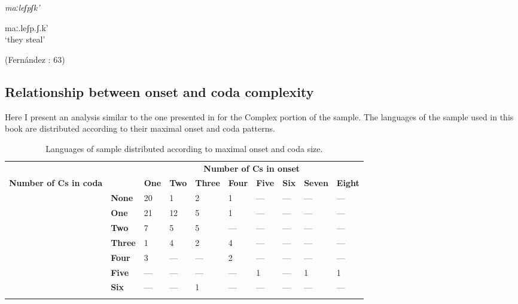 \ea\label{ex:3.14}

\textit{maːleʃpʃk’}

maː.leʃp.ʃ.k’\\
\glt ‘they steal’

(Fernández \citealt{GarayHernández2006}: 63)
\z

\subsection{Relationship between onset and coda complexity}\label{sec:3.3.2}

  Here I present an analysis similar to the one presented in  for the Complex portion of the \citet{Maddieson2013a} sample. The languages of the sample used in this book are distributed according to their maximal onset and coda patterns.

\begin{table}
\begin{tabularx}{\textwidth}{XXXXXXXXXX}
\lsptoprule

{} &  & \multicolumn{8}{c}{ \textbf{Number of Cs in onset}}\\
{ \textbf{Number of Cs in coda}} &  & \textbf{One} & \textbf{Two} & \textbf{Three} & \textbf{Four} & \textbf{Five} & \textbf{Six} & \textbf{Seven} & \textbf{Eight}\\
& \textbf{None} & 20 & 1 & 2 & 1 & — & — & — & —\\
\hhline{~---------} & \textbf{One} & 21 & 12 & 5 & 1 & — & — & — & —\\
\hhline{~---------} & \textbf{Two} & 7 & 5 & 5 & — & — & — & — & —\\
\hhline{~---------} & \textbf{Three} & 1 & 4 & 2 & 4 & — & — & — & —\\
\hhline{~---------} & \textbf{Four} & 3 & — & — & 2 & — & — & — & —\\
\hhline{~---------} & \textbf{Five} & — & — & — & — & 1 & — & 1 & 1\\
\hhline{~---------} & \textbf{Six} & — & — & 1 & — & — & — & — & —\\
\hhline{~---------}
\lspbottomrule
\end{tabularx}
\caption{\label{tab:3.2}Languages of sample distributed according to maximal onset and coda size.}
\end{table}

